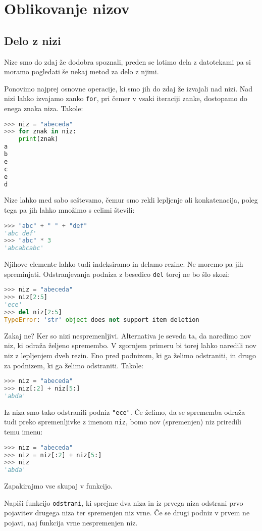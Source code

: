 \chapter{Oblikovanje nizov}

\section{Delo z nizi}

Nize smo do zdaj že dodobra spoznali, preden se lotimo dela z datotekami pa si moramo pogledati še nekaj metod za delo z njimi.

Ponovimo najprej osnovne operacije, ki smo jih do zdaj že izvajali nad nizi. Nad nizi lahko izvajamo zanko \texttt{for}, pri čemer v vsaki iteraciji zanke, dostopamo do enega znaka niza. Takole:
\begin{lstlisting}[language=Python, showstringspaces=false]
>>> niz = "abeceda"
>>> for znak in niz:
	print(znak)
a
b
e
c
e
d
\end{lstlisting}
Nize lahko med sabo seštevamo, čemur smo rekli lepljenje ali konkatenacija, poleg tega pa jih lahko množimo s celimi števili:
\begin{lstlisting}[language=Python, showstringspaces=false]
>>> "abc" + " " + "def"
'abc def'
>>> "abc" * 3
'abcabcabc'
\end{lstlisting}
Njihove elemente lahko tudi indeksiramo in delamo rezine. Ne moremo pa jih spreminjati. Odstranjevanja podniza z besedico \texttt{del} torej ne bo šlo skozi:
\begin{lstlisting}[language=Python, showstringspaces=false]
>>> niz = "abeceda"
>>> niz[2:5]
'ece'
>>> del niz[2:5]
TypeError: 'str' object does not support item deletion
\end{lstlisting}
Zakaj ne? Ker so nizi nespremenljivi. Alternativa je seveda ta, da naredimo nov niz, ki odraža željeno spremembo. V zgornjem primeru bi torej lahko naredili nov niz z lepljenjem dveh rezin. Eno pred podnizom, ki ga želimo odstraniti, in drugo za podnizem, ki ga želimo odstraniti. Takole:
\begin{lstlisting}[language=Python, showstringspaces=false]
>>> niz = "abeceda"
>>> niz[:2] + niz[5:]
'abda'
\end{lstlisting}
Iz niza smo tako odstranili podniz \texttt{"ece"}. Če želimo, da se sprememba odraža tudi preko spremenljivke z imenom \texttt{niz}, bomo nov (spremenjen) niz priredili temu imenu:
\begin{lstlisting}[language=Python, showstringspaces=false]
>>> niz = "abeceda"
>>> niz = niz[:2] + niz[5:]
>>> niz
'abda'
\end{lstlisting}
Zapakirajmo vse skupaj v funkcijo.
\begin{zgled}
Napiši funkcijo \texttt{odstrani}, ki sprejme dva niza in iz prvega niza odstrani prvo pojavitev drugega niza ter spremenjen niz vrne. Če se drugi podniz v prvem ne pojavi, naj funkcija vrne nespremenjen niz.
\end{zgled}

